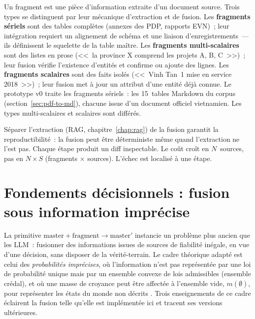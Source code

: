 \documentclass[a4paper,11pt]{report}
\begin{document}
Un fragment est une pièce d'information extraite d'un document source. Trois types se distinguent par leur mécanique d'extraction et de fusion. Les \textbf{fragments sériels} sont des tables complètes (annexes des PDP, rapports EVN)~; leur intégration requiert un alignement de schéma et une liaison d'enregistrements~--- ils définissent le squelette de la table maître. Les \textbf{fragments multi-scalaires} sont des listes en prose (<<~la province X comprend les projets A, B, C~>>)~; leur fusion vérifie l'existence d'entités et confirme ou ajoute des lignes. Les \textbf{fragments scalaires} sont des faits isolés (<<~Vinh Tan~1 mise en service 2018~>>)~; leur fusion met à jour un attribut d'une entité déjà connue. Le prototype v0 traite les fragments sériels~: les 15~tables Markdown du corpus (section~\ref{sec:pdf-to-md}), chacune issue d'un document officiel vietnamien. Les types multi-scalaires et scalaires sont différés.

Séparer l'extraction (RAG, chapitre~\ref{chap:rag}) de la fusion garantit la reproductibilité~: la fusion peut être déterministe même quand l'extraction ne l'est pas. Chaque étape produit un diff inspectable. Le coût croît en $N$~sources, pas en $N \times S$ (fragments $\times$ sources). L'échec est localisé à une étape.

\section{Fondements décisionnels : fusion sous information imprécise}\label{sec:imprecise}

La primitive $\mathrm{master}+\mathrm{fragment}\rightarrow\mathrm{master}'$ instancie un problème plus ancien que les LLM~: fusionner des informations issues de sources de fiabilité inégale, en vue d'une décision, sans disposer de la vérité-terrain. Le cadre théorique adapté est celui des \emph{probabilités imprécises}, où l'information n'est pas représentée par une loi de probabilité unique mais par un ensemble convexe de lois admissibles (ensemble crédal), et où une masse de croyance peut être affectée à l'ensemble vide, $m(\emptyset)$, pour représenter les états du monde non décrits \citep{HaDuong2005}. Trois enseignements de ce cadre éclairent la fusion telle qu'elle est implémentée ici et tracent ses versions ultérieures.
\end{document}
